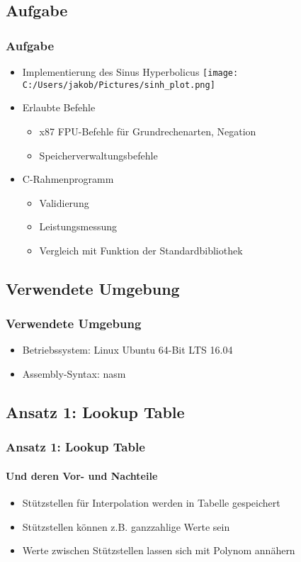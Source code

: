 	\frame{\titlepage}
	\begin{frame}
		\tableofcontents
	\end{frame}
	\begin{frame}
		\section{Aufgabe}
		\frametitle{Aufgabe}
		\begin{itemize}
			\item Implementierung des Sinus Hyperbolicus
			\texttt{[image: C:/Users/jakob/Pictures/sinh\_plot.png]}
			\item Erlaubte Befehle
			\begin{itemize}
				\item x87 FPU-Befehle für Grundrechenarten, Negation
				\item Speicherverwaltungsbefehle
			\end{itemize}
			\item C-Rahmenprogramm
			\begin{itemize}
				\item Validierung
				\item Leistungsmessung 
				\item Vergleich mit Funktion der Standardbibliothek
			\end{itemize}
		\end{itemize}
	\end{frame}
	\begin{frame}
		\section{Verwendete Umgebung}
		\frametitle{Verwendete Umgebung}
		\begin{itemize}
			\item Betriebssystem: Linux Ubuntu 64-Bit LTS 16.04
			\item Assembly-Syntax: nasm
		\end{itemize}
	\end{frame}
	\begin{frame}
		\section{Ansatz 1: Lookup Table}
		\frametitle{Ansatz 1: Lookup Table}
		\framesubtitle{Und deren Vor- und Nachteile}
		\begin{itemize}
			\item Stützstellen für Interpolation werden in Tabelle gespeichert
			\item Stützstellen können z.B. ganzzahlige Werte sein
			\item Werte zwischen Stützstellen lassen sich mit Polynom annähern
		\end{itemize}
	\end{frame}
